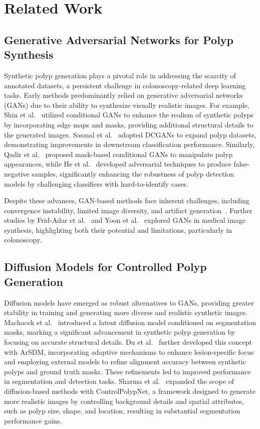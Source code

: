 \section{Related Work}
\subsection{Generative Adversarial Networks for Polyp Synthesis}

Synthetic polyp generation plays a pivotal role in addressing the scarcity of annotated datasets, a persistent challenge in colonoscopy-related deep learning tasks. Early methods predominantly relied on generative adversarial networks (GANs) due to their ability to synthesize visually realistic images. For example, Shin et al.~\cite{shin2018abnormal} utilized conditional GANs to enhance the realism of synthetic polyps by incorporating edge maps and masks, providing additional structural details to the generated images. Sasmal et al.~\cite{sasmal2020improved} adopted DCGANs to expand polyp datasets, demonstrating improvements in downstream classification performance. Similarly, Qadir et al.~\cite{qadir2022simple} proposed mask-based conditional GANs to manipulate polyp appearances, while He et al.~\cite{he2021colonoscopic} developed adversarial techniques to produce false-negative samples, significantly enhancing the robustness of polyp detection models by challenging classifiers with hard-to-identify cases.

Despite these advances, GAN-based methods face inherent challenges, including convergence instability, limited image diversity, and artifact generation~\cite{dhariwal2021diffusion}. Further studies by Frid-Adar et al.~\cite{frid2018gan} and Yoon et al.~\cite{yoon2022colonoscopic} explored GANs in medical image synthesis, highlighting both their potential and limitations, particularly in colonoscopy.

\subsection{Diffusion Models for Controlled Polyp Generation}

Diffusion models have emerged as robust alternatives to GANs, providing greater stability in training and generating more diverse and realistic synthetic images. Machacek et al.~\cite{machavcek2023mask} introduced a latent diffusion model conditioned on segmentation masks, marking a significant advancement in synthetic polyp generation by focusing on accurate structural details. Du et al.~\cite{du2023arsdm} further developed this concept with ArSDM, incorporating adaptive mechanisms to enhance lesion-specific focus and employing external models to refine alignment accuracy between synthetic polyps and ground truth masks. These refinements led to improved performance in segmentation and detection tasks. Sharma et al.~\cite{Sharma_2024_CVPR} expanded the scope of diffusion-based methods with ControlPolypNet, a framework designed to generate more realistic images by controlling background details and spatial attributes, such as polyp size, shape, and location, resulting in substantial segmentation performance gains.

